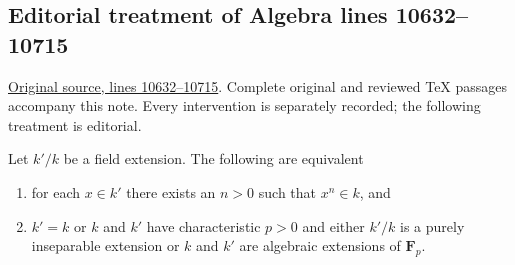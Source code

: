 \subsection{Editorial treatment of Algebra lines 10632--10715}

\hypertarget{algebra-context-126}{}

\noindent\href{https://github.com/stacks/stacks-project/blob/a04446e57ec1fbc252a871afcec7752fb2807b14/algebra.tex\#L10632}{Original source, lines 10632--10715}. Complete original and reviewed TeX passages accompany this note. Every intervention is separately recorded; the following treatment is editorial.


\begin{lemma}
\label{editorial-source-lemma-powers-field}
\begin{reference}
\cite[Lemma 3.1.6]{Alper-adequate}
\end{reference}
Let $k'/k$ be a field extension. The following are equivalent
\begin{enumerate}
\item for each $x \in k'$ there exists an $n > 0$ such that $x^n \in k$, and
\item $k' = k$ or $k$ and $k'$ have characteristic $p > 0$ and
either $k'/k$ is a purely inseparable extension or
$k$ and $k'$ are algebraic extensions of $\mathbf{F}_p$.
\end{enumerate}
\end{lemma}

